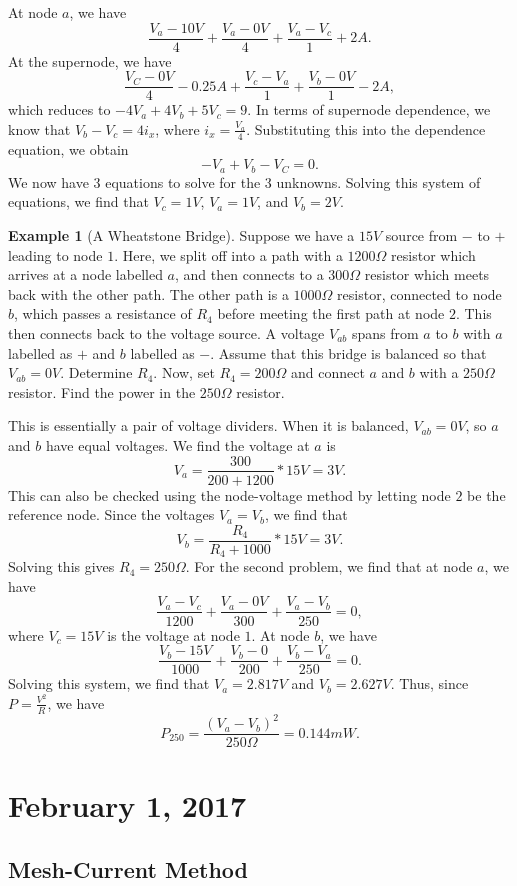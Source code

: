 \documentclass[11pt]{article}
\theoremstyle{plain} %
\theoremstyle{definition}
\theoremstyle{example}
\newtheorem*{example}{Example}
\theoremstyle{remark}
\begin{document}
At node $a$, we have 
$$\frac{V_a-10V}{4} + \frac{V_a-0V}{4} + \frac{V_a-V_c}{1} + 2A.$$
At the supernode, we have 
$$\frac{V_C-0V}{4} -0.25A+\frac{V_c-V_a}{1} + \frac{V_b-0V}{1} -2A,$$
which reduces to $-4V_a+4V_b+5V_c=9$. In terms of supernode dependence, we know that $V_b-V_c = 4i_x$, where $i_x = \frac{V_a}{4}$. Substituting this into the dependence equation, we obtain 
$$-V_a+V_b-V_C=0.$$
We now have 3 equations to solve for the 3 unknowns. Solving this system of equations, we find that $V_c=1V$, $V_a = 1V$, and $V_b = 2V$. 

\begin{example}[A Wheatstone Bridge]
Suppose we have a $15V$ source from $-$ to $+$ leading to node $1$. Here, we split off into a path with a $1200\Omega$ resistor which arrives at a node labelled $a$, and then connects to a $300\Omega$ resistor which meets back with the other path. The other path is a $1000\Omega$ resistor, connected to node $b$, which passes a resistance of $R_4$ before meeting the first path at node $2$. This then connects back to the voltage source. A voltage $V_{ab}$ spans from $a$ to $b$ with $a$ labelled as $+$ and $b$ labelled as $-$. Assume that this bridge is balanced so that $V_{ab} = 0V$. Determine $R_4$. Now, set $R_4 = 200\Omega$ and connect $a$ and $b$ with a $250\Omega$ resistor. Find the power in the $250\Omega$ resistor. 
\end{example}

This is essentially a pair of voltage dividers. When it is balanced, $V_{ab} = 0V$, so $a$ and $b$ have equal voltages. We find the voltage at $a$ is $$V_a =\frac{300}{200+1200}*15V = 3V.$$ This can also be checked using the node-voltage method by letting node $2$ be the reference node. Since the voltages $V_a = V_b$, we find that $$V_b = \frac{R_4}{R_4+1000}*15V = 3V.$$
Solving this gives $R_4 = 250\Omega$. For the second problem, we find that at node $a$, we have 
$$\frac{V_a-V_c}{1200}+\frac{V_a-0V}{300}+\frac{V_a-V_b}{250} = 0,$$
where $V_c=15V$ is the voltage at node $1$. At node $b$, we have $$\frac{V_b-15V}{1000} + \frac{V_b-0}{200} + \frac{V_b-V_a}{250} = 0.$$
Solving this system, we find that $V_a = 2.817V$ and $V_b = 2.627V$. Thus, since $P = \frac{V^2}{R}$, we have 
$$P_{250} = \frac{(V_a-V_b)^2}{250\Omega} = 0.144mW.$$

\section{February 1, 2017}
\subsection{Mesh-Current Method}
\end{document}
